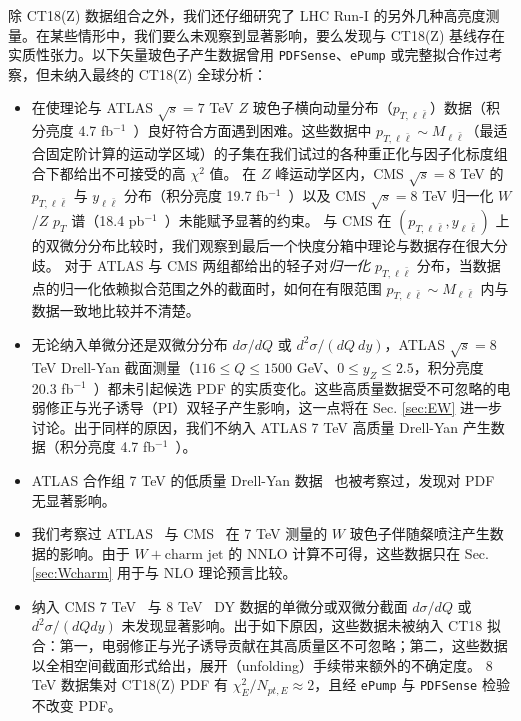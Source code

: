 除 CT18(Z) 数据组合之外，我们还仔细研究了 LHC Run-I 的另外几种高亮度测量。在某些情形中，我们要么未观察到显著影响，要么发现与 CT18(Z) 基线存在实质性张力。以下矢量玻色子产生数据曾用 {\tt PDFSense}、{\tt ePump} 或完整拟合作过考察，但未纳入最终的 CT18(Z) 全球分析：
\begin{itemize}
\item 在使理论与 ATLAS $\sqrt{s}=7$ TeV $Z$ 玻色子横向动量分布（$p_{T,  \ell \bar \ell}$）数据（积分亮度 4.7 fb$^{-1}$~\cite{Aad:2014xaa}）良好符合方面遇到困难。这些数据中 $p_{T,  \ell \bar \ell} \sim M_{\ell \bar \ell}$（最适合固定阶计算的运动学区域）的子集在我们试过的各种重正化与因子化标度组合下都给出不可接受的高 $\chi^2$ 值。
在 $Z$ 峰运动学区内，CMS $\sqrt{s}=8$ TeV 的 $p_{T,  \ell \bar \ell}$ 与 $y_{\ell \bar \ell}$ 分布（积分亮度 19.7 fb$^{-1}$~\cite{Khachatryan:2015oaa}）以及 CMS $\sqrt{s}=8$ TeV 归一化 $W$/$Z$ $p_T$ 谱（18.4 pb$^{-1}$~\cite{Khachatryan:2016nbe}）未能赋予显著的约束。
与 CMS 在 $(p_{T,  \ell \bar \ell},y_{\ell \bar \ell})$ 上的双微分分布比较时，我们观察到最后一个快度分箱中理论与数据存在很大分歧。
对于 ATLAS 与 CMS 两组都给出的轻子对{\it 归一化} $p_{T,  \ell \bar \ell}$ 分布，当数据点的归一化依赖拟合范围之外的截面时，如何在有限范围 $p_{T,  \ell \bar \ell} \sim M_{\ell \bar \ell}$ 内与数据一致地比较并不清楚。

\item 无论纳入单微分还是双微分分布 $d \sigma/dQ$ 或 $d^2 \sigma/(dQ\ dy)$，ATLAS $\sqrt{s}=8$ TeV Drell-Yan 截面测量（$116 \leq Q\leq 1500$ GeV、$0 \leq y_Z\leq2.5$，积分亮度 20.3 fb$^{-1}$~\cite{Aad:2016zzw}）都未引起候选 PDF 的实质变化。这些高质量数据受不可忽略的电弱修正与光子诱导（PI）双轻子产生影响，这一点将在 Sec. \ref{sec:EW} 进一步讨论。出于同样的原因，我们不纳入 ATLAS 7 TeV 高质量 Drell-Yan 产生数据（积分亮度 4.7 fb$^{-1}$~\cite{Aad:2013iua}）。



\item ATLAS 合作组 7 TeV 的低质量 Drell-Yan 数据~\cite{Aad:2014qja} 也被考察过，发现对 PDF 无显著影响。

\item 我们考察过 ATLAS~\cite{Aad:2014xca} 与 CMS~\cite{Chatrchyan:2013uja} 在 7 TeV 测量的 $W$ 玻色子伴随粲喷注产生数据的影响。由于 $W+\mbox{charm jet}$ 的 NNLO 计算不可得，这些数据只在 Sec. \ref{sec:Wcharm} 用于与 NLO 理论预言比较。

\item 纳入 CMS 7 TeV~\cite{Chatrchyan:2013tia} 与 8 TeV~\cite{CMS:2014jea} DY 数据的单微分或双微分截面 $d\sigma/dQ$ 或 $d^2\sigma/(dQdy)$ 未发现显著影响。出于如下原因，这些数据未被纳入 CT18 拟合：第一，电弱修正与光子诱导贡献在其高质量区不可忽略；第二，这些数据以全相空间截面形式给出，展开（unfolding）手续带来额外的不确定度。
8 TeV 数据集对 CT18(Z) PDF 有 $\chi^2_E/N_{pt, E} \approx 2$，且经 \texttt{ePump} 与 \texttt{PDFSense} 检验不改变 PDF。
\end{itemize}






